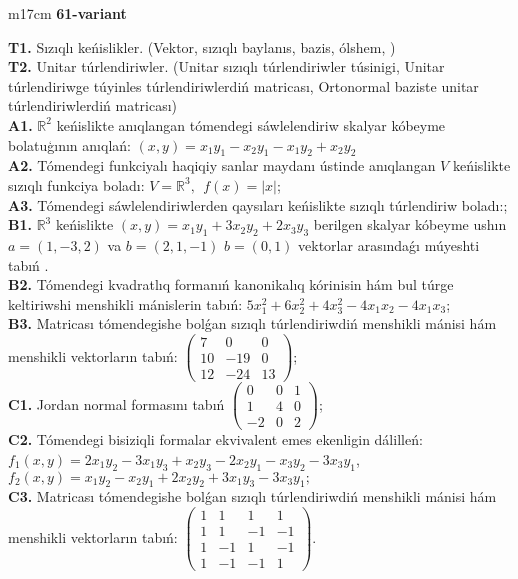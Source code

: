 \documentclass{article}
\begin{document}
\begin{tabular}{m{17cm}}
\textbf{61-variant}
\newline

\textbf{T1.} Sızıqlı keńislikler.   (Vektor,  sızıqlı baylanıs, bazis, ólshem, )  \\
\textbf{T2.} Unitar túrlendiriwler. (Unitar sızıqlı túrlendiriwler túsinigi,  Unitar túrlendiriwge túyinles túrlendiriwlerdiń matricası,   Ortonormal baziste unitar túrlendiriwlerdiń matricası) \\
\textbf{A1.} \(\mathbb{R}^{2}\) keńislikte anıqlangan tómendegi sáwlelendiriw skalyar kóbeyme bolatuģının anıqlań: \((x,y) = x_{1}y_{1} - x_{2}y_{1} - x_{1}y_{2} + x_{2}y_{2}\) \\
\textbf{A2.} Tómendegi funkciyalı haqiqiy sanlar maydanı ústinde anıqlangan \(V\) keńislikte sızıqlı funkciya boladı: \(V = \mathbb{R}^{3},\ \ f(x) = |x|\); \\
\textbf{A3.} Tómendegi sáwlelendiriwlerden qaysıları keńislikte sızıqlı túrlendiriw boladı:; \\
\textbf{B1.} \(\mathbb{R}^{3}\) keńislikte \((x,y) = x_{1}y_{1} + 3x_{2}y_{2} + 2x_{3}y_{3}\) berilgen skalyar kóbeyme ushın \(a = (1, - 3,2)\) va \(b = (2,1, - 1)\) \(b = (0,1)\) vektorlar arasındaǵı múyeshti tabıń . \\
\textbf{B2.} Tómendegi kvadratlıq formanıń kanonikalıq kórinisin hám bul túrge keltiriwshi menshikli mánislerin tabıń: \(5x_{1}^{2} + 6x_{2}^{2} + 4x_{3}^{2} - 4x_{1}x_{2} - 4x_{1}x_{3}\); \\
\textbf{B3.} Matricası tómendegishe bolǵan sızıqlı túrlendiriwdiń menshikli mánisi hám menshikli vektorların tabıń: \(\begin{pmatrix} 7 & 0 & 0 \\ 10 & - 19 & 0 \\ 12 & - 24 & 13 \end{pmatrix}\); \\
\textbf{C1.} Jordan normal formasını tabıń \(\begin{pmatrix} 0 & 0 & 1 \\ 1 & 4 & 0 \\  - 2 & 0 & 2 \end{pmatrix}\); \\
\textbf{C2.} Tómendegi bisiziqli formalar ekvivalent emes ekenligin dálilleń:\(f_{1}(x,y) = 2x_{1}y_{2} - 3x_{1}y_{3} + x_{2}y_{3} - 2x_{2}y_{1} - x_{3}y_{2} - 3x_{3}y_{1}\),\(f_{2}(x,y) = x_{1}y_{2} - x_{2}y_{1} + 2x_{2}y_{2} + 3x_{1}y_{3} - 3x_{3}y_{1};\) \\
\textbf{C3.} Matricası tómendegishe bolǵan sızıqlı túrlendiriwdiń menshikli mánisi hám menshikli vektorların tabıń: \(\begin{pmatrix} 1 & 1 & 1 & 1 \\ 1 & 1 & - 1 & - 1 \\ 1 & - 1 & 1 & - 1 \\ 1 & - 1 & - 1 & 1 \end{pmatrix}\). \\

\end{tabular}
\vspace{1cm}
\end{document}
